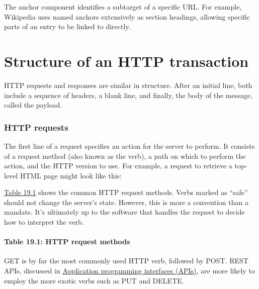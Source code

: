 The {anchor} component identifies a subtarget of a specific URL. For
example, Wikipedia uses named anchors extensively as section headings,
allowing specific parts of an entry to be linked to directly.


\section{Structure of an HTTP transaction}

HTTP requests and responses are similar in structure. After an initial
line, both include a sequence of headers, a blank line, and finally, the
body of the message, called the payload.

\subsubsection[HTTP
requests]{\texorpdfstring{\protect\hypertarget{part0027_split_003.htmlux5cux23_idTextAnchor1211}{}{}HTTP
requests}{HTTP requests}}

The first line of a request specifies an action for the server to
perform. It consists of a request method (also known as the verb), a
path on which to perform the action, and the HTTP version to use. For
example, a request to retrieve a top-level HTML page might look like
this:


\protect\hyperlink{part0027_split_003.htmlux5cux23_idTextAnchor1212}{Table
19.1} shows the common HTTP request methods. Verbs marked as ``safe''
should not change the server's state. However, this is more a convention
than a mandate. It's ultimately up to the software that handles the
request to decide how to interpret the verb.

\paragraph[{Table 19.1: }HTTP request methods]{\texorpdfstring{{Table
19.1:
}\protect\hypertarget{part0027_split_003.htmlux5cux23_idIndexMarker2760}{}{}\protect\hypertarget{part0027_split_003.htmlux5cux23_idTextAnchor1212}{}{}HTTP
request methods}{Table 19.1: HTTP request methods}}


GET is by far the most commonly used HTTP verb, followed by POST. REST
APIs, discussed in
\protect\hyperlink{part0027_split_014.htmlux5cux23_idTextAnchor1244}{{Application
programming interfaces (APIs)}}, are more likely to employ the more
exotic verbs such as PUT and DELETE.

